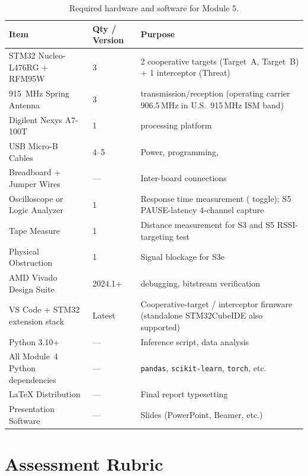 \documentclass[11pt,letterpaper]{article}
\begin{document}
	\begin{table}[ht!]
		\centering
		\caption{Required hardware and software for Module 5.}
		\label{tab:hw_sw}
		\renewcommand{\arraystretch}{1.3}
		\begin{tabularx}{\textwidth}{l l X}
			\toprule
			\textbf{Item} & \textbf{Qty / Version} & \textbf{Purpose} \\
			\midrule
			STM32 Nucleo-L476RG + RFM95W & 3 & 2 cooperative targets (Target~A, Target~B) + 1 interceptor (Threat) \\
			915~MHz Spring Antenna & 3 & \RF{} transmission/reception (operating carrier 906.5\,MHz in U.S.\ 915\,MHz ISM band) \\
			Digilent Nexys A7-100T & 1 & \FPGA{} processing platform \\
			USB Micro-B Cables & 4--5 & Power, programming, \UART{} \\
			Breadboard + Jumper Wires & --- & Inter-board connections \\
			Oscilloscope or Logic Analyzer & 1 & Response time measurement (\GPIO{} toggle); S5 PAUSE-latency 4-channel capture \\
			Tape Measure & 1 & Distance measurement for S3 and S5 RSSI-targeting test \\
			Physical Obstruction & 1 & Signal blockage for S3e \\
			\midrule
			AMD Vivado Design Suite & 2024.1+ & \ILA{} debugging, bitstream verification \\
			VS Code + STM32 extension stack & Latest & Cooperative-target / interceptor firmware (standalone STM32CubeIDE also supported) \\
			Python 3.10+ & --- & Inference script, data analysis \\
			All Module~4 Python dependencies & --- & \texttt{pandas}, \texttt{scikit-learn}, \texttt{torch}, etc. \\
			\LaTeX{} Distribution & --- & Final report typesetting \\
			Presentation Software & --- & Slides (PowerPoint, Beamer, etc.) \\
			\bottomrule
		\end{tabularx}
	\end{table}

	\section{Assessment Rubric}
\end{document}
